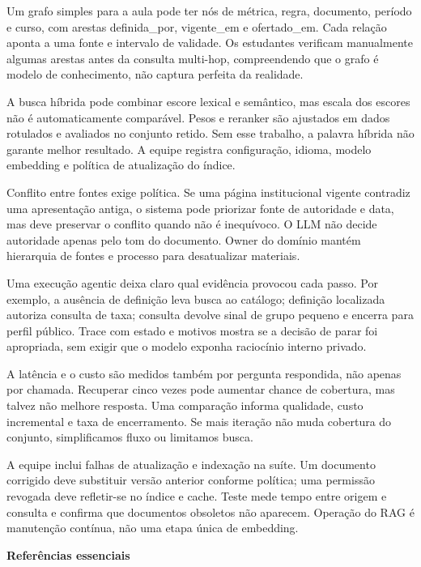 Um grafo simples para a aula pode ter nós de métrica, regra, documento, período e curso, com arestas definida\_por, vigente\_em e ofertado\_em. Cada relação aponta a uma fonte e intervalo de validade. Os estudantes verificam manualmente algumas arestas antes da consulta multi-hop, compreendendo que o grafo é modelo de conhecimento, não captura perfeita da realidade.

A busca híbrida pode combinar escore lexical e semântico, mas escala dos escores não é automaticamente comparável. Pesos e reranker são ajustados em dados rotulados e avaliados no conjunto retido. Sem esse trabalho, a palavra híbrida não garante melhor resultado. A equipe registra configuração, idioma, modelo embedding e política de atualização do índice.

Conflito entre fontes exige política. Se uma página institucional vigente contradiz uma apresentação antiga, o sistema pode priorizar fonte de autoridade e data, mas deve preservar o conflito quando não é inequívoco. O LLM não decide autoridade apenas pelo tom do documento. Owner do domínio mantém hierarquia de fontes e processo para desatualizar materiais.

Uma execução agentic deixa claro qual evidência provocou cada passo. Por exemplo, a ausência de definição leva busca ao catálogo; definição localizada autoriza consulta de taxa; consulta devolve sinal de grupo pequeno e encerra para perfil público. Trace com estado e motivos mostra se a decisão de parar foi apropriada, sem exigir que o modelo exponha raciocínio interno privado.

A latência e o custo são medidos também por pergunta respondida, não apenas por chamada. Recuperar cinco vezes pode aumentar chance de cobertura, mas talvez não melhore resposta. Uma comparação informa qualidade, custo incremental e taxa de encerramento. Se mais iteração não muda cobertura do conjunto, simplificamos fluxo ou limitamos busca.

A equipe inclui falhas de atualização e indexação na suíte. Um documento corrigido deve substituir versão anterior conforme política; uma permissão revogada deve refletir-se no índice e cache. Teste mede tempo entre origem e consulta e confirma que documentos obsoletos não aparecem. Operação do RAG é manutenção contínua, não uma etapa única de embedding.

\bigskip
\noindent\textbf{Referências essenciais}

